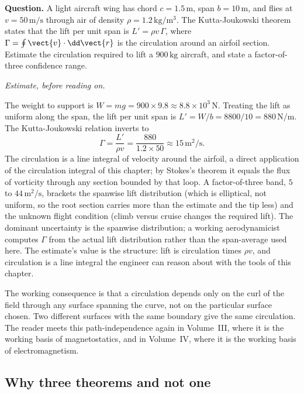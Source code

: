 \begin{estimation}
\textbf{Question.} A light aircraft wing has chord $c = 1.5\,\si{\meter}$,
span $b = 10\,\si{\meter}$, and flies at $v = 50\,\si{\meter\per
\second}$ through air of density $\rho = 1.2\,\si{\kilogram\per\meter
\cubed}$. The Kutta-Joukowski theorem states that the lift per unit
span is $L' = \rho v\,\Gamma$, where $\Gamma = \oint\vect{v}\cdot
\dd\vect{r}$ is the circulation around an airfoil section. Estimate the
circulation required to lift a $900\,\si{\kilogram}$ aircraft, and
state a factor-of-three confidence range.

\smallskip
\textit{Estimate, before reading on.}

\smallskip
The weight to support is $W = mg = 900\times 9.8 \approx 8.8\times
10^{3}\,\si{\newton}$. Treating the lift as uniform along the span,
the lift per unit span is $L' = W/b = 8800/10 = 880\,\si{\newton\per
\meter}$. The Kutta-Joukowski relation inverts to
\[
\Gamma = \frac{L'}{\rho v} = \frac{880}{1.2\times 50} \approx
15\,\si{\meter\squared\per\second}.
\]
The circulation is a line integral of velocity around the airfoil, a
direct application of the circulation integral of this chapter; by
Stokes's theorem it equals the flux of vorticity through any section
bounded by that loop. A factor-of-three band, $5$ to $44\,\si{\meter
\squared\per\second}$, brackets the spanwise lift distribution (which
is elliptical, not uniform, so the root section carries more than the
estimate and the tip less) and the unknown flight condition (climb
versus cruise changes the required lift). The dominant uncertainty is
the spanwise distribution; a working aerodynamicist computes $\Gamma$
from the actual lift distribution rather than the span-average used
here. The estimate's value is the structure: lift is circulation
times $\rho v$, and circulation is a line integral the engineer can
reason about with the tools of this chapter.
\end{estimation}

The working consequence is that a circulation depends only on the
curl of the field through any surface spanning the curve, not on the
particular surface chosen. Two different surfaces with the same
boundary give the same circulation. The reader meets this
path-independence again in Volume~III, where it is the working
basis of magnetostatics, and in Volume~IV, where it is the
working basis of electromagnetism.

\subsection{Why three theorems and not one}

